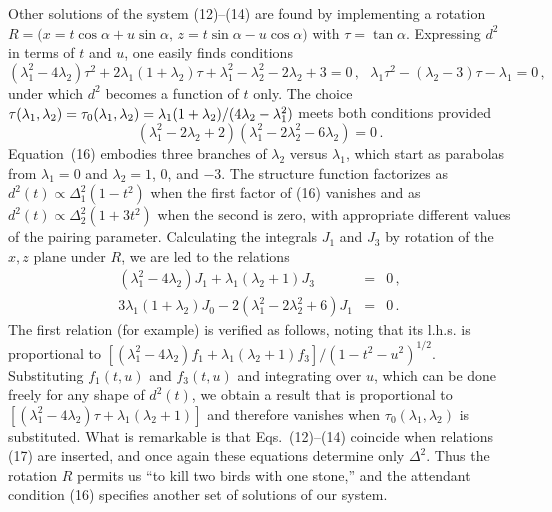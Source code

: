 Other solutions of the system (12)--(14) are found by implementing 
a rotation \\
$R=\bigl( x=t\cos\alpha+u\sin\alpha,\, z=t\sin\alpha-u\cos\alpha\bigr)$ 
with $\tau=\tan\alpha$.  Expressing $d^2$ 
in terms of $t$ and $u$, one easily finds conditions
\begin{equation}
  (\lambda^2_1-4\lambda_2)\tau^2
+ 2\lambda_1(1+\lambda_2)\tau
+ \lambda^2_1-\lambda^2_2-2\lambda_2 +3=0 \, ,~~~
  \lambda_1\tau^2-(\lambda_2-3)\tau -\lambda_1=0 \, ,
\end{equation}
under which  $d^2$ becomes a function of $t$ only.  The choice 
$\tau(\lambda_1,\lambda_2)=\tau_0(\lambda_1,\lambda_2) =\\
\lambda_1(1+\lambda_2)/(4\lambda_2-\lambda^2_1)$ 
meets both conditions provided
\begin{equation}
(\lambda^2_1-2\lambda_2+2)(\lambda^2_1-2\lambda^2_2-6\lambda_2)=0 \, .
\end{equation}
Equation~(16) embodies three branches of $\lambda_2$ versus $\lambda_1$, 
which start as parabolas from $\lambda_1=0$ and $\lambda_2=1$, 0, and $-3$.  
The structure function factorizes as $d^2(t)\propto\Delta^2_1(1-t^2)$ 
when the first factor of (16) vanishes and as 
$d^2(t)\propto\Delta^2_2(1+3t^2)$ when the second is zero, with
appropriate different values of the pairing parameter.
Calculating the integrals $J_1$ and $J_3$ by rotation of the 
$x,z$ plane under $R$, we are led to the relations
\begin{eqnarray}
    (\lambda^2_1-4\lambda_2)J_1+\lambda_1(\lambda_2+1)J_3
&=& 0 \, ,\nonumber\\
    3\lambda_1(1+\lambda_2)J_0-2(\lambda^2_1-2\lambda^2_2+6)J_1
&=& 0 \, .
\end{eqnarray}
The first relation (for example) is verified as follows, noting
that its l.h.s. is proportional to 
$[(\lambda^2_1-4\lambda_2)f_1+\lambda_1(\lambda_2+1)f_3]/(1-t^2-u^2)^{1/2}$. 
Substituting $f_1(t,u)$ and $f_3(t,u)$ and integrating over $u$, 
which can be done freely for any shape of $d^2(t)$, 
we obtain a result that is proportional to 
$[(\lambda^2_1-4\lambda_2)\tau+\lambda_1(\lambda_2+1)]$ and therefore
vanishes when $\tau_0(\lambda_1,\lambda_2)$ is substituted.  What is 
remarkable is that Eqs.~(12)--(14) coincide when relations (17) 
are inserted, and once again these equations determine only 
$\Delta^2$. Thus the rotation $R$ permits us ``to kill two birds with 
one stone,'' and the attendant condition (16) specifies another
set of solutions of our system. 

